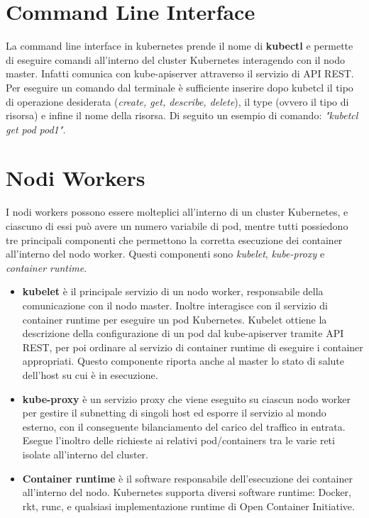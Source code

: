 \documentclass[12pt, a4paper]{report}
\begin{document}
\section{Command Line Interface}
La command line interface in kubernetes prende il nome di \textbf{kubectl} e permette di eseguire comandi all'interno del cluster Kubernetes interagendo con il nodo master. Infatti comunica con kube-apiserver attraverso il servizio di API REST. Per eseguire un comando dal terminale è sufficiente inserire dopo kubetcl il tipo di operazione desiderata (\textit{create, get, describe, delete}), il type (ovvero il tipo di risorsa) e infine il nome della risorsa. Di seguito un esempio di comando: \textit{"kubetcl get pod pod1"}.
\section{Nodi Workers}
I nodi workers possono essere molteplici all'interno di un cluster Kubernetes, e ciascuno di essi può avere un numero variabile di pod, mentre tutti possiedono tre principali componenti che permettono la corretta esecuzione dei container all'interno del nodo worker. Questi componenti sono \textit{kubelet}, \textit{kube-proxy} e \textit{container runtime}.
\begin{itemize}
  \item \textbf{kubelet} è il principale servizio di un nodo worker, responsabile della comunicazione con il nodo master. Inoltre interagisce con il servizio di container runtime per eseguire un pod Kubernetes. Kubelet ottiene la descrizione della configurazione di un pod dal kube-apiserver tramite API REST, per poi ordinare al servizio di container runtime di eseguire i container appropriati. Questo componente riporta anche al master lo stato di salute dell'host su cui è in esecuzione.
  \item \textbf{kube-proxy} è un servizio proxy che viene eseguito su ciascun nodo worker per gestire il subnetting di singoli host ed esporre il servizio al mondo esterno, con il conseguente bilanciamento del carico del traffico in entrata. Esegue l'inoltro delle richieste ai relativi pod/containers tra le varie reti isolate all'interno del cluster.
  \item \textbf{Container runtime} è il software responsabile dell'esecuzione dei container all'interno del nodo. Kubernetes supporta diversi software runtime: Docker, rkt, runc, e qualsiasi implementazione runtime di Open Container Initiative.
\end{itemize}
\end{document}
